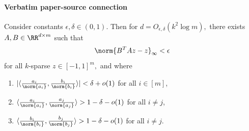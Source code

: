 \documentclass[10pt]{article}
\begin{document}
\paragraph{Verbatim paper-source connection}
\begin{ReviewVerbatim}
\begin{proposition}\label{prop:geometry-1}
    Consider constants $\epsilon, \delta\in (0,1)$. Then for $d = O_{\epsilon,\delta}(k^2\log m),$ there exists $A,B\in \RR^{d\times m}$ such that
    \begin{equation}
        \norm{B^TAz - z}_\infty < \epsilon
    \end{equation}
    for all $k$-sparse $z\in [-1,1]^m,$ and where
    \begin{enumerate}
        \item[(i)] $|\langle \frac{a_i}{\norm{a_i}}, \frac{b_i}{\norm{b_i}}\rangle| < \delta + o(1)$ for all $i\in [m]$,
        \item[(ii)] $\langle \frac{a_i}{\norm{a_i}}, \frac{a_j}{\norm{a_j}}\rangle
        > 1 - \delta - o(1)$ for all $i\neq j$,
        \item[(iii)] $\langle \frac{b_i}{\norm{b_i}}, \frac{b_j}{\norm{b_j}}\rangle > 1 - \delta - o(1)$ for all $i\neq j$.
    \end{enumerate}
\end{proposition}


\end{ReviewVerbatim}
\end{document}
